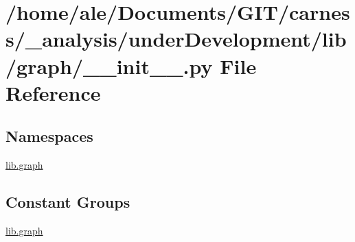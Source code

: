 \hypertarget{a00045}{\section{/home/ale/\-Documents/\-G\-I\-T/carness/\-\_\-analysis/under\-Development/lib/graph/\-\_\-\-\_\-init\-\_\-\-\_\-.py File Reference}
\label{a00045}
}
\subsection*{Namespaces}
\begin{DoxyCompactItemize}
\item 
\hyperlink{a00105}{lib.\-graph}
\end{DoxyCompactItemize}
\subsection*{Constant Groups}
\begin{DoxyCompactItemize}
\item 
\hyperlink{a00105}{lib.\-graph}
\end{DoxyCompactItemize}
